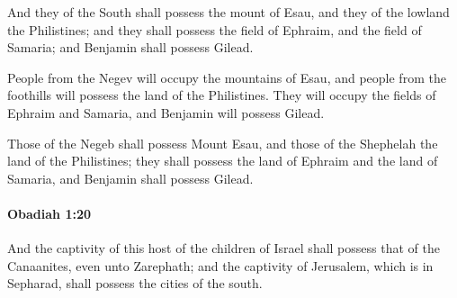 			\begin{versebox}
					\item[BHS] 
					\item[LXX] 
					\item[ASV] And they of the South shall possess the mount of Esau, and they of the lowland the Philistines; and they shall possess the field of Ephraim, and the field of Samaria; and Benjamin shall possess Gilead.
					\item[NIV] People from the Negev will occupy the mountains of Esau, and people from the foothills will possess the land of the Philistines. They will occupy the fields of Ephraim and Samaria, and Benjamin will possess Gilead.
					\item[NRSV] Those of the Negeb shall possess Mount Esau, and those of the Shephelah the land of the Philistines; they shall possess the land of Ephraim and the land of Samaria, and Benjamin shall possess Gilead.
			\end{versebox}

		\paragraph{Obadiah 1:20} %
			\label{OBADIAH-1-20}

			And the captivity of this host of the children of Israel shall possess that of the Canaanites, even unto Zarephath; and the captivity of Jerusalem, which is in Sepharad, shall possess the cities of the south.

